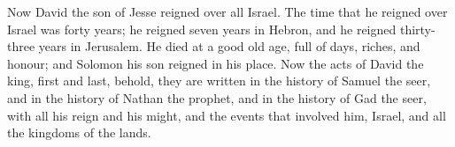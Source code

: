  Now David the son of Jesse reigned over all Israel.
 The time that he reigned over Israel was forty years; he
reigned seven years in Hebron, and he reigned thirty-three years in
Jerusalem.  He died at a good old age, full of days,
riches, and honour; and Solomon his son reigned in his place.
 Now the acts of David the king, first and last, behold,
they are written in the history of Samuel the seer, and in the history
of Nathan the prophet, and in the history of Gad the seer, 
with all his reign and his might, and the events that involved him,
Israel, and all the kingdoms of the lands.
